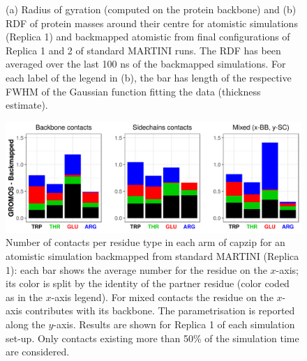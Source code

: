 \begin{figure}
\centering
\vspace{1cm}
\caption[Backmapping simulations: R$_g$ and RDF]{(a) Radius of gyration (computed on the protein backbone) and (b) RDF of protein masses around their centre for atomistic simulations (Replica 1) and backmapped atomistic from final configurations of Replica 1 and 2 of standard MARTINI runs. The RDF has been averaged over the last 100 ns of the backmapped simulations. For each label of the legend in (b), the bar has length of the respective FWHM of the Gaussian function fitting the data (thickness estimate). }
\label{fig:backmap}
\vspace{1.5cm}
\centering
\includegraphics[width=0.95\linewidth]{3results_capsule/pics/contacts_BM.png} 
\caption[Backmapping simulations: contacts]{Number of contacts per residue type in each arm of capzip for an atomistic simulation backmapped from standard MARTINI (Replica 1): each bar shows the average number for the residue on the $x$-axis; its color is split by the identity of the partner residue (color coded as in the $x$-axis legend). For mixed contacts the residue on the $x$-axis contributes with its backbone. The parametrisation is reported along the $y$-axis. Results are shown for Replica 1 of each simulation set-up. Only contacts existing more than 50\% of the simulation time are considered.}
\label{fig:BM_contacts}
\vspace{1cm}
\end{figure}

